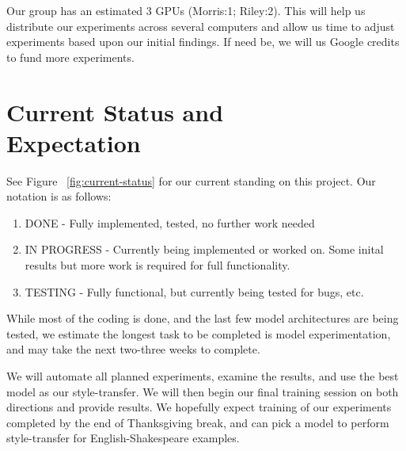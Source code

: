 \documentclass[twoside,twocolumn]{article}
\begin{document}
Our group has an estimated 3 GPUs (Morris:1; Riley:2). This will help us
distribute our experiments across several computers and allow us time to adjust
experiments based upon our initial findings. If need be, we will us Google
credits to fund more experiments.


\section{Current Status and\\Expectation}
See Figure ~\ref{fig:current-status} for our current standing on this project.
Our notation is as follows:
\begin{enumerate}
  \item DONE - Fully implemented, tested, no further work needed
  \item IN PROGRESS - Currently being implemented or worked on. Some inital results
    but more work is required for full functionality.
  \item TESTING - Fully functional, but currently being tested for bugs, etc.
\end{enumerate}

While most of the coding is done, and the last few model architectures are
being tested, we estimate the longest task to be completed is model
experimentation, and may take the next two-three weeks to complete.

We will automate all planned experiments, examine the results, and use the best
model as our style-transfer. We will then begin our final training session
on both directions and provide results. We hopefully expect training of our
experiments completed by the end of Thanksgiving break, and can pick a model
to perform style-transfer for English-Shakespeare examples.









\clearpage
\appendix
\onecolumn
\end{document}
